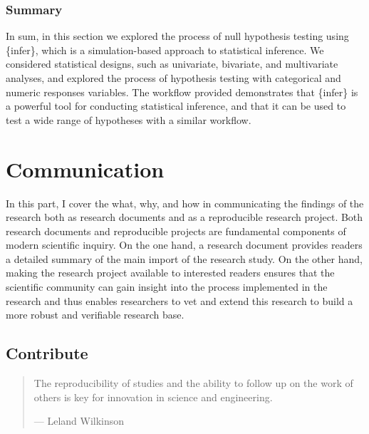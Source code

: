 \documentclass[
  letterpaper,
]{latex/krantz}
\theoremstyle{definition}
\theoremstyle{remark}
\begin{document}
\section*{Summary}\label{summary-9}


In sum, in this section we explored the process of null hypothesis
testing using \{infer\}, which is a simulation-based approach to
statistical inference. We considered statistical designs, such as
univariate, bivariate, and multivariate analyses, and explored the
process of hypothesis testing with categorical and numeric responses
variables. The workflow provided demonstrates that \{infer\} is a
powerful tool for conducting statistical inference, and that it can be
used to test a wide range of hypotheses with a similar workflow.

\part{Communication}

In this part, I cover the what, why, and how in communicating the
findings of the research both as research documents and as a
reproducible research project. Both research documents and reproducible
projects are fundamental components of modern scientific inquiry. On the
one hand, a research document provides readers a detailed summary of the
main import of the research study. On the other hand, making the
research project available to interested readers ensures that the
scientific community can gain insight into the process implemented in
the research and thus enables researchers to vet and extend this
research to build a more robust and verifiable research base.

\chapter{Contribute}\label{sec-contribute-chapter}

\begin{quote}
The reproducibility of studies and the ability to follow up on the work
of others is key for innovation in science and engineering.

--- Leland Wilkinson
\end{quote}
\end{document}
